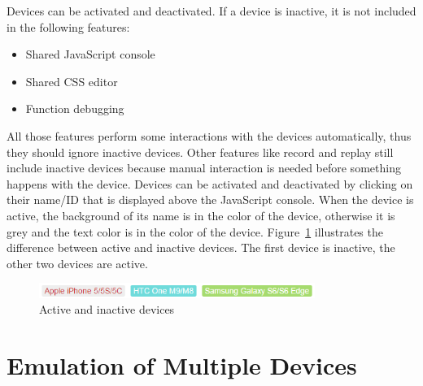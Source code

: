 Devices can be activated and deactivated. If a device is inactive, it is not included in the following features:
\begin{itemize}
	\item Shared JavaScript console
	\item Shared CSS editor
	\item Function debugging
\end{itemize}
All those features perform some interactions with the devices automatically, thus they should ignore inactive devices. Other features like record and replay still include inactive devices because manual interaction is needed before something happens with the device. Devices can be activated and deactivated by clicking on their name/ID that is displayed above the JavaScript console. When the device is active, the background of its name is in the color of the device, otherwise it is grey and the text color is in the color of the device. Figure~\ref{fig:active_inactive} illustrates the difference between active and inactive devices. The first device is inactive, the other two devices are active.

\begin{figure}[H]
  \centering
    \includegraphics[width=0.8\textwidth]{images/screenshots/active_inactive.png}
	\caption[Screenshot: Active/inactive devices]{Active and inactive devices}
	\label{fig:active_inactive}
\end{figure}

\section{Emulation of Multiple Devices}


